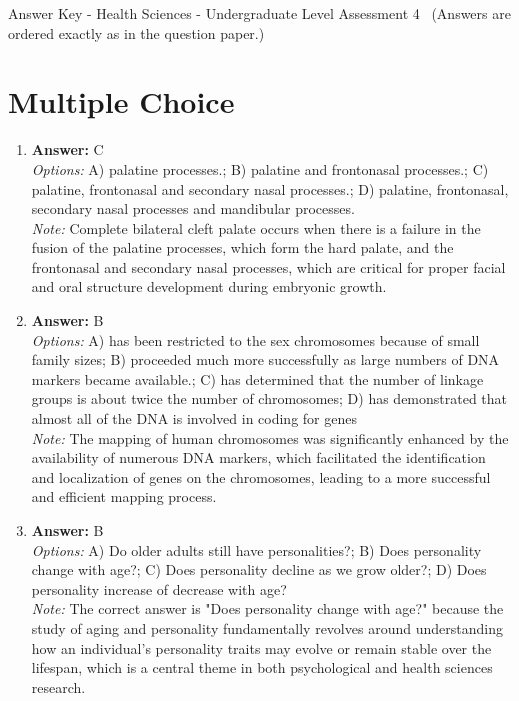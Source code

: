 \documentclass[12pt]{article}
\begin{document}
\begin{center}
Answer Key - Health Sciences - Undergraduate Level Assessment 4 \
\small (Answers are ordered exactly as in the question paper.)
\end{center}

\section*{Multiple Choice}
\begin{enumerate}[label=\arabic*.]
\item \textbf{Answer:} C
\\ \textit{Options:} A) palatine processes.; B) palatine and frontonasal processes.; C) palatine, frontonasal and secondary nasal processes.; D) palatine, frontonasal, secondary nasal processes and mandibular processes.
\\ \textit{Note:} Complete bilateral cleft palate occurs when there is a failure in the fusion of the palatine processes, which form the hard palate, and the frontonasal and secondary nasal processes, which are critical for proper facial and oral structure development during embryonic growth.
\item \textbf{Answer:} B
\\ \textit{Options:} A) has been restricted to the sex chromosomes because of small family sizes; B) proceeded much more successfully as large numbers of DNA markers became available.; C) has determined that the number of linkage groups is about twice the number of chromosomes; D) has demonstrated that almost all of the DNA is involved in coding for genes
\\ \textit{Note:} The mapping of human chromosomes was significantly enhanced by the availability of numerous DNA markers, which facilitated the identification and localization of genes on the chromosomes, leading to a more successful and efficient mapping process.
\item \textbf{Answer:} B
\\ \textit{Options:} A) Do older adults still have personalities?; B) Does personality change with age?; C) Does personality decline as we grow older?; D) Does personality increase of decrease with age?
\\ \textit{Note:} The correct answer is "Does personality change with age?" because the study of aging and personality fundamentally revolves around understanding how an individual's personality traits may evolve or remain stable over the lifespan, which is a central theme in both psychological and health sciences research.

\end{enumerate}
\end{document}
